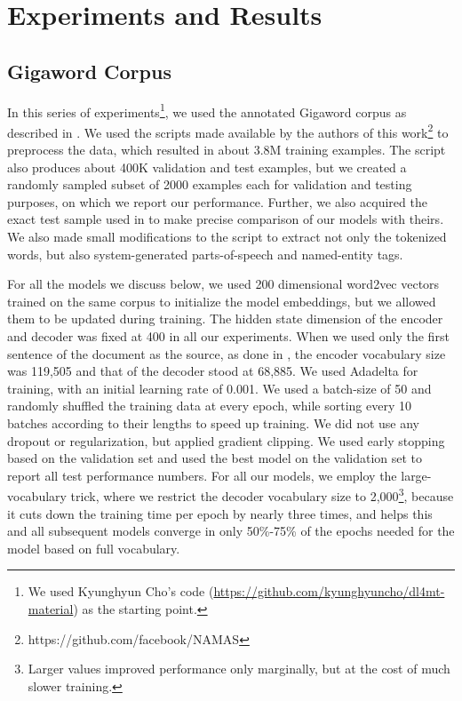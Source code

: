 \section{Experiments and Results}\label{sec:exp}

\subsection{Gigaword Corpus}

In this series of experiments\footnote{We used Kyunghyun Cho's code (\url{https://github.com/kyunghyuncho/dl4mt-material}) as the starting point.}, we used the annotated Gigaword corpus as described in . We used the scripts made available by the authors of this work\footnote{https://github.com/facebook/NAMAS} to preprocess the data, which resulted in about 3.8M training examples. The script also produces about 400K validation and test examples, but we created a randomly sampled subset of 2000 examples each for validation and testing purposes, on which we report our performance. Further, we also acquired the exact test sample used in  to make precise comparison of our models with theirs.
We also made small modifications to the script to extract not only the tokenized words, but also system-generated parts-of-speech and named-entity tags. %

 For all the models we discuss below, we used 200 dimensional word2vec vectors \cite{word2vec} trained on the same corpus to initialize the model embeddings, but we allowed them to be updated during training. 
The hidden state dimension of the encoder and decoder was fixed at 400 in all our experiments. 
When we used only the first sentence of the document as the source, as done in , the encoder vocabulary size was 119,505 and that of the decoder stood at 68,885. We used Adadelta \cite{adadelta} for training, with an initial learning rate of 0.001. We used a batch-size of 50 and randomly shuffled the training data at every epoch, while sorting every 10 batches according to their lengths to speed up training. We did not use any dropout or regularization, but applied gradient clipping. We used early stopping based on the validation set and used the best model on the validation set to report all test performance numbers. %
For all our models, we employ the large-vocabulary trick, where we restrict the decoder vocabulary size to 2,000\footnote{Larger values improved performance only marginally, but at the cost of much slower training.}, because it cuts down the training time per epoch by nearly three times, and helps this and all subsequent models converge in only 50\%-75\% of the epochs needed for the model based on full vocabulary.

